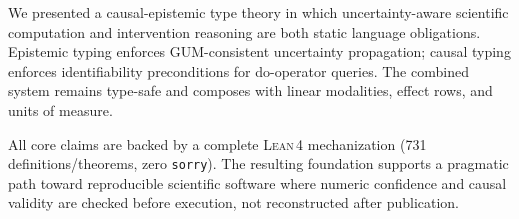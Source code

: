 \documentclass[acmsmall,screen,review,anonymous]{acmart}
\newcommand{\lean}{\textsc{Lean\,4}\xspace}
\begin{document}
We presented a causal-epistemic type theory in which uncertainty-aware
scientific computation and intervention reasoning are both static
language obligations.
Epistemic typing enforces GUM-consistent uncertainty propagation;
causal typing enforces identifiability preconditions for do-operator
queries.
The combined system remains type-safe and composes with linear
modalities, effect rows, and units of measure.

All core claims are backed by a complete \lean mechanization
(731 definitions/theorems, zero \texttt{sorry}).
The resulting foundation supports a pragmatic path toward reproducible
scientific software where numeric confidence and causal validity are
checked before execution, not reconstructed after publication.



\end{document}
